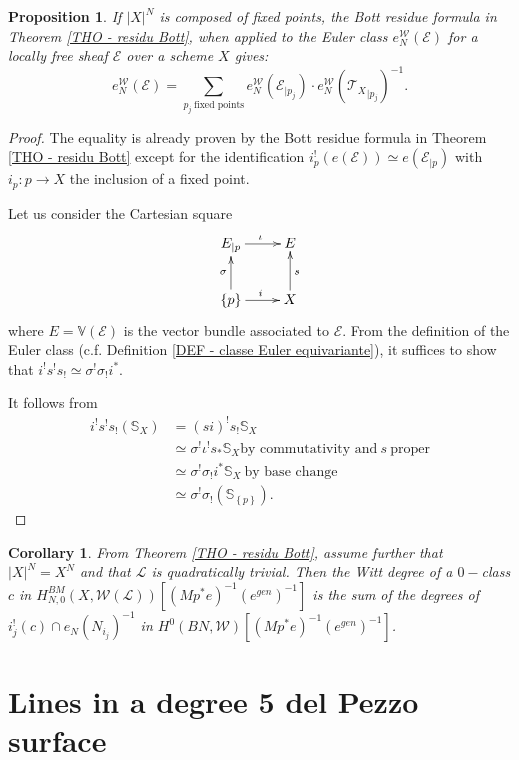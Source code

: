 \documentclass{amsart}
\theoremstyle{plain}%
\newtheorem{prop}[subsubsection]{Proposition}
\newtheorem{cor}[subsubsection]{Corollary}
\theoremstyle{remark}
\theoremstyle{definition}
\newcommand{\cE}{\mathcal{E}}
\newcommand{\cL}{\mathcal{L}}
\newcommand{\cT}{\mathcal{T}}
\newcommand{\cW}{\mathcal{W}}
\newcommand{\eS}{\mathbb{S}}
\newcommand{\eV}{\mathbb{V}}
\newcommand{\rest}[2]{{#1}_{\mid #2}}
\newcommand{\accol}[1]{\left\{#1\right\}}
\newcommand{\vabs}[1]{\left| #1\right|}
\begin{document}
\begin{prop}\label{PROP - residu de Bott specialise points fixes}
If $\vabs{X}^N$ is composed of fixed points, the Bott residue formula in Theorem \ref{THO - residu Bott}, when applied to the Euler class $e_N^\cW(\cE)$ for a locally free sheaf $\cE$ over a scheme $X$ gives:
\[ e_N^\cW(\cE) = \sum_{p_j\ \text{fixed points}} e^\cW_N(\rest{\cE}{p_j})\cdot e^\cW_N(\rest{\cT_X}{p_j})^{-1}.\]
\end{prop}
\begin{proof}
The equality is already proven by the Bott residue formula in Theorem \ref{THO - residu Bott} except for the identification $i_p^!(e(\cE)) \simeq e(\rest{\cE}{p})$ with $i_p : p \to X$ the inclusion of a fixed point.

Let us consider the Cartesian square
\[\xymatrix{\rest{E}{p} \ar[r]^{\iota} & E\\ 
\accol{p} \ar[u]^{\sigma} \ar[r]^{i} & X \ar[u]_s}\]
where $E = \eV(\cE)$ is the vector bundle associated to $\cE.$ From the definition of the Euler class (c.f. Definition \ref{DEF - classe Euler equivariante}), it suffices to show that $i^!s^!s_! \simeq \sigma^!\sigma_!i^\ast.$

It follows from
\begin{align*}
    i^!s^!s_!(\eS_X)& = (s i)^!s_!\eS_X \\
    & \simeq \sigma^!\iota^! s_\ast \eS_X \text{by commutativity and}\ s\ \text{proper}\\
    & \simeq \sigma^!\sigma_!i^\ast \eS_X\ \text{by base change}\\
    & \simeq \sigma^! \sigma_!(\eS_{\accol{p}}).
\end{align*}
\end{proof}


\begin{cor}\label{COR - simplification AB}
From Theorem \ref{THO - residu Bott}, assume further that $\vabs{X}^N = X^N$ and that $\cL$ is quadratically trivial.
Then the Witt degree of a $0-$class $c$ in $H^{BM}_{N,0}(X,\cW(\cL))[(Mp^\ast e)^{-1}(e^{gen})^{-1}]$ is the sum of the degrees of $i_j^!(c) \cap e_N(N_{i_j})^{-1}$ in $H^0(BN,\cW)[(Mp^\ast e)^{-1}(e^{gen})^{-1}]$.
\end{cor}




\section{Lines in a degree 5 del Pezzo surface}\label{SEC - geometrie droites dP5}
\end{document}
